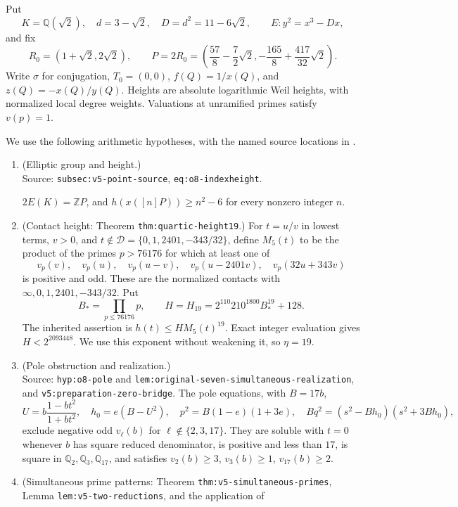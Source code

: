 \documentclass[11pt,a4paper]{article}
\theoremstyle{definition}
\theoremstyle{remark}
\begin{document}
Put
\[
 K=\mathbb Q(\sqrt2),\quad d=3-\sqrt2,\quad D=d^2=11-6\sqrt2,
 \qquad E:y^2=x^3-Dx,
\]
and fix
\[
 R_0=(1+\sqrt2,2\sqrt2),\qquad
 P=2R_0=\left(\frac{57}{8}-\frac72\sqrt2,
          -\frac{165}{8}+\frac{417}{32}\sqrt2\right).
\]
Write $\sigma$ for conjugation, $T_0=(0,0)$, $f(Q)=1/x(Q)$,
and $z(Q)=-x(Q)/y(Q)$.  Heights are absolute logarithmic Weil
heights, with normalized local degree weights.  Valuations at
unramified primes satisfy $v(p)=1$.

We use the following arithmetic hypotheses, with the named source
locations in \cite{RepositoryV9}.
\begin{enumerate}
\item (Elliptic group and height.)\\
      Source: \nolinkurl{subsec:v5-point-source}, \nolinkurl{eq:o8-indexheight}.\par $2E(K)=\mathbb ZP$, and
      $h(x([n]P))\ge n^2-6$ for every nonzero integer $n$.
\item (Contact height: Theorem \nolinkurl{thm:quartic-height19}.)
      For $t=u/v$ in lowest terms, $v>0$, and
      $t\notin\mathcal D=\{0,1,2401,-343/32\}$, define $M_5(t)$
      to be the product of the primes $p>76176$ for which at least one of
\[
 v_p(v),\quad v_p(u),\quad v_p(u-v),\quad
 v_p(u-2401v),\quad v_p(32u+343v)
\]
      is positive and odd.  These are the normalized contacts with
      $\infty,0,1,2401,-343/32$.  Put
\[
 B_* =\prod_{p\le76176}p,\qquad
 H=H_{19}=2^{110}210^{1800}B_*^{19}+128.
\]
      The inherited assertion is $h(t)\le H M_5(t)^{19}$.
      Exact integer evaluation gives $H<2^{2093448}$.
      We use this exponent without weakening it, so $\eta=19$.
\item (Pole obstruction and realization.)\\
      Source: \nolinkurl{hyp:o8-pole} and
      \nolinkurl{lem:original-seven-simultaneous-realization}, and
      \nolinkurl{v5:preparation-zero-bridge}.
      The pole equations, with $B=17b$,
\[
 U=b\frac{1-bt^2}{1+bt^2},\quad h_0=e(B-U^2),\quad
 p^2=B(1-e)(1+3e),\quad
 Bq^2=(s^2-Bh_0)(s^2+3Bh_0),
\]
      exclude negative odd $v_\ell(b)$ for $\ell\notin\{2,3,17\}$.
      They are soluble with $t=0$ whenever $b$ has square reduced
      denominator, is positive and less than $17$, is square in
      $\mathbb Q_2,\mathbb Q_3,\mathbb Q_{17}$, and satisfies
      $v_2(b)\ge3$, $v_3(b)\ge1$, $v_{17}(b)\ge2$.
\item (Simultaneous prime patterns: Theorem \nolinkurl{thm:v5-simultaneous-primes},
      Lemma \nolinkurl{lem:v5-two-reductions}, and the application of

\end{enumerate}
\end{document}

